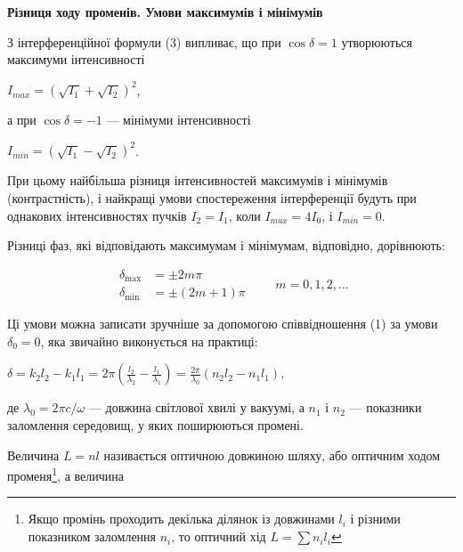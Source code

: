 \documentclass[12pt,a4paper]{article}
\begin{document}
    \begin{center} \textbf{Різниця ходу променів. Умови максимумів і мінімумів} \end{center}

    З інтерференційної формули (3) випливає, що при $\cos \delta = 1$ утворюються максимуми інтенсивності
    
    \begin{center}
        $I_{max} = \left( \sqrt{I_1} + \sqrt{I_2} \right)^2$,
    \end{center}

    а при $\cos \delta = -1$ --- мінімуми інтенсивності

    \begin{center}
        $I_{min} = \left( \sqrt{I_1} - \sqrt{I_2} \right)^2$.
    \end{center}

    При цьому найбільша різниця інтенсивностей максимумів і мінімумів (контрастність), і найкращі умови спостереження інтерференції будуть при однакових інтенсивностях пучків
    $I_2 = I_1$, коли $I_{max} = 4I_0$, і $I_{min} = 0$.

    Різниці фаз, які відповідають максимумам і мінімумам, відповідно, дорівнюють:

    \begin{equation}
        \tag{4}
        \begin{aligned}
        \delta_{\text{max}} &= \pm 2m\pi \\
        \delta_{\text{min}} &= \pm (2m + 1)\pi
        \end{aligned}
        \qquad m = 0, 1, 2, \ldots
    \end{equation}

    Ці умови можна записати зручніше за допомогою співвідношення (1) за умови
    $\delta_0 = 0$, яка звичайно виконується на практиці:

    \begin{center}
        $\displaystyle \delta = k_2 l_2 - k_1 l_1 = 2\pi \left( \frac{l_2}{\lambda_2} - \frac{l_1}{\lambda_1} \right) = 
        \frac{2\pi}{\lambda_0} \left( n_2 l_2 - n_1 l_1 \right)$,
    \end{center}

    де $\lambda_0 = 2\pi c/\omega$ --- довжина світлової хвилі у вакуумі, а $n_1$ і $n_2$ --- показники заломлення середовищ, у яких поширюються промені.

    \newpage

    Величина $L = nl$ називається оптичною довжиною шляху, або оптичним ходом променя\footnote{Якщо промінь проходить
    декілька ділянок із довжинами $l_i$ і різними показником заломлення $n_i$, то оптичний хід $L = \sum n_i l_i$},
    а величина
\end{document}
